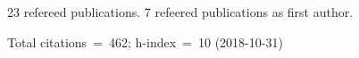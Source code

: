 23 refereed publications. 7 refeered publications as first author.

Total citations~=~462; h-index~=~10 (2018-10-31)